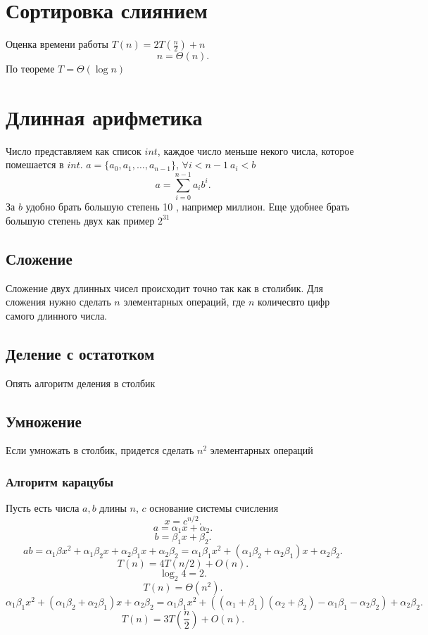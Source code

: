 \documentclass[14pt]{extarticle}
\begin{document}
    \section{Сортировка слиянием}
    Оценка времени работы $T(n) = 2 T (\frac{n}{2}) + n$ 
    \[
    n = \Theta(n)
    .\] 
    По теореме $T = \Theta(\log n)$
    \section{Длинная арифметика}
    Число представляем как список $int$, каждое число меньше некого числа, которое помешается в  $int$. $a = \{a_0,a_1,\dots,a_{n-1}\}$, $\forall i < n -1~ a_{i} < b$
     \[
     a = \sum_{i = 0}^{n-1} a_i b^{i}
     .\] 
     За $b$ удобно брать большую степень 10 , например миллион. Еще удобнее брать большую степень двух как пример  $2^{31}$
     \subsection{Сложение}
     Сложение двух длинных чисел происходит точно так как в столибик. Для сложения нужно сделать $n$ элементарных операций, где  $n$ количесвто цифр самого длинного числа.
    \subsection{Деление с остатотком}
    Опять алгоритм деления в столбик
    \subsection{Умножение}
    Если умножать в столбик, придется сделать  $n^2$ элементарных операций
    \subsubsection{Алгоритм карацубы}
    Пусть есть числа $a,b$ длины  $n$,  $c$ основание системы счисления
     \[
    x = c^{n/2}
    .\] 
    \[
    a = \alpha_1 x + \alpha_2
    .\] 
    \[
    b = \beta_1 x + \beta_2
    .\] 
    \[
    ab = \alpha_1 \beta x^2 + \alpha_1 \beta_2 x + \alpha_2 \beta_1 x + \alpha_2  \beta_2 = \alpha_1 \beta_1 x^2 + (\alpha_1 \beta_2 + \alpha_2 \beta_1) x + \alpha_2 \beta_2
    .\] 
    \[
    T(n) = 4 T(n/2) + O(n)
    .\] 
    \[
    \log_{2}4 = 2
    .\] 
    \[
    T(n) = \Theta(n^2)
    .\] 
    \[
    \alpha_1 \beta_1 x^2 + (\alpha_1 \beta_2 + \alpha_2 \beta_1) x + \alpha_2 \beta_2 = \alpha_1 \beta_1 x^2 + ((\alpha_1 + \beta_1)(\alpha_2 + \beta_2) -\alpha_1 \beta_1 -\alpha_2 \beta_2) + \alpha_2 \beta_2
    .\] 
    \[
    T(n) = 3 T(\frac{n}{2}) + O(n)
    .\] 
\end{document}
